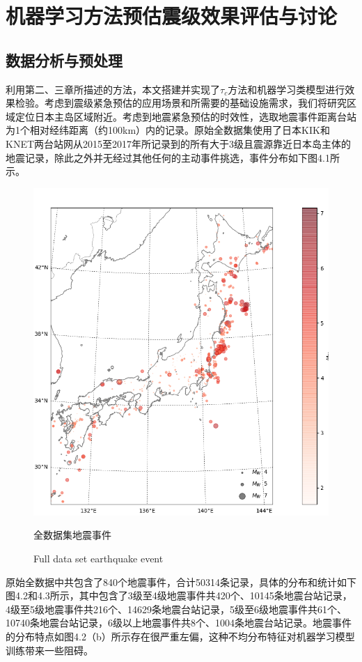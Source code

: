 \chapter{机器学习方法预估震级效果评估与讨论 }
\section{数据分析与预处理}
\indent 利用第二、三章所描述的方法，本文搭建并实现了$\tau_{c}$方法和机器学习类模型进行效果检验。考虑到震级紧急预估的应用场景和所需要的基础设施需求，我们将研究区域定位日本主岛区域附近。考虑到地震紧急预估的时效性，选取地震事件距离台站为1个相对经纬距离（约100km）内的记录。原始全数据集使用了日本KIK和KNET两台站网从2015至2017年所记录到的所有大于3级且震源靠近日本岛主体的地震记录，除此之外并无经过其他任何的主动事件挑选，事件分布如下图4.1所示。\\
\begin{figure}[!h] 
\centering 
 \includegraphics[width=0.8\linewidth]{img/basemap.jpg} 
 \renewcommand{\figurename}{图} 
\caption{全数据集地震事件} 
\addtocounter{figure}{-1} \vspace{-5pt} 
\renewcommand{\figurename}{Fig} 
\caption{Full data set earthquake event} 
\renewcommand{\figurename}{图} 
\label{fig:network-device-influence.png} 
\end{figure}
\indent 原始全数据中共包含了840个地震事件，合计50314条记录，具体的分布和统计如下图4.2和4.3所示，其中包含了3级至4级地震事件共420个、10145条地震台站记录，4级至5级地震事件共216个、14629条地震台站记录，5级至6级地震事件共61个、10740条地震台站记录，6级以上地震事件共8个、1004条地震台站记录。地震事件的分布特点如图4.2（b）所示存在很严重左偏，这种不均分布特征对机器学习模型训练带来一些阻碍。\\
